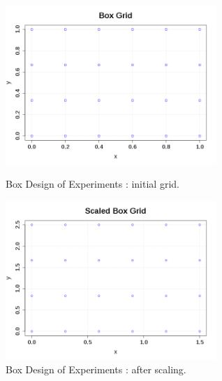              \begin{figure}[H]
               \begin{minipage}{10cm}
                 \begin{center}
                   \includegraphics[width=8cm]{Figures/BoxGrid.png}
                   \caption{Box Design of Experiments  : initial grid.}
                   \label{BoxGrid}
                 \end{center}
               \end{minipage}
               \hfill
               \begin{minipage}{10cm}
                 \begin{center}
                   \includegraphics[width=8cm]{Figures/ScaledBoxGrid.png}
                   \caption{Box Design of Experiments  : after scaling.}
                   \label{ScaledBoxGrid}
                 \end{center}
               \end{minipage}
             \end{figure}

